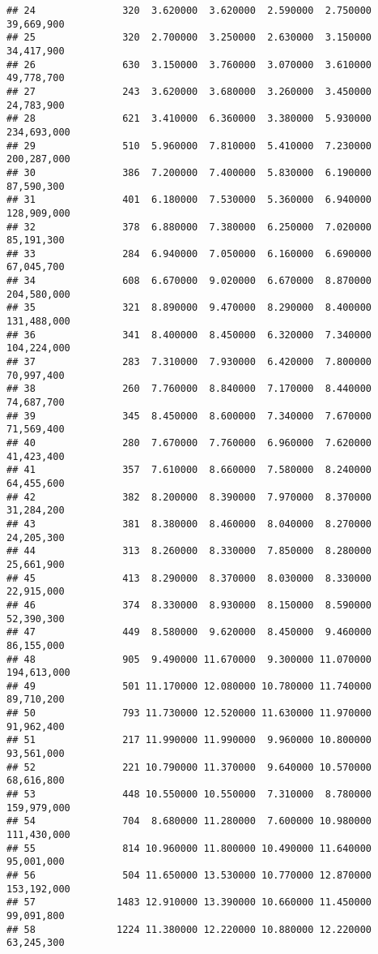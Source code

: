 \documentclass[]{article}
\begin{document}
\begin{verbatim}
## 24               320  3.620000  3.620000  2.590000  2.750000  39,669,900
## 25               320  2.700000  3.250000  2.630000  3.150000  34,417,900
## 26               630  3.150000  3.760000  3.070000  3.610000  49,778,700
## 27               243  3.620000  3.680000  3.260000  3.450000  24,783,900
## 28               621  3.410000  6.360000  3.380000  5.930000 234,693,000
## 29               510  5.960000  7.810000  5.410000  7.230000 200,287,000
## 30               386  7.200000  7.400000  5.830000  6.190000  87,590,300
## 31               401  6.180000  7.530000  5.360000  6.940000 128,909,000
## 32               378  6.880000  7.380000  6.250000  7.020000  85,191,300
## 33               284  6.940000  7.050000  6.160000  6.690000  67,045,700
## 34               608  6.670000  9.020000  6.670000  8.870000 204,580,000
## 35               321  8.890000  9.470000  8.290000  8.400000 131,488,000
## 36               341  8.400000  8.450000  6.320000  7.340000 104,224,000
## 37               283  7.310000  7.930000  6.420000  7.800000  70,997,400
## 38               260  7.760000  8.840000  7.170000  8.440000  74,687,700
## 39               345  8.450000  8.600000  7.340000  7.670000  71,569,400
## 40               280  7.670000  7.760000  6.960000  7.620000  41,423,400
## 41               357  7.610000  8.660000  7.580000  8.240000  64,455,600
## 42               382  8.200000  8.390000  7.970000  8.370000  31,284,200
## 43               381  8.380000  8.460000  8.040000  8.270000  24,205,300
## 44               313  8.260000  8.330000  7.850000  8.280000  25,661,900
## 45               413  8.290000  8.370000  8.030000  8.330000  22,915,000
## 46               374  8.330000  8.930000  8.150000  8.590000  52,390,300
## 47               449  8.580000  9.620000  8.450000  9.460000  86,155,000
## 48               905  9.490000 11.670000  9.300000 11.070000 194,613,000
## 49               501 11.170000 12.080000 10.780000 11.740000  89,710,200
## 50               793 11.730000 12.520000 11.630000 11.970000  91,962,400
## 51               217 11.990000 11.990000  9.960000 10.800000  93,561,000
## 52               221 10.790000 11.370000  9.640000 10.570000  68,616,800
## 53               448 10.550000 10.550000  7.310000  8.780000 159,979,000
## 54               704  8.680000 11.280000  7.600000 10.980000 111,430,000
## 55               814 10.960000 11.800000 10.490000 11.640000  95,001,000
## 56               504 11.650000 13.530000 10.770000 12.870000 153,192,000
## 57              1483 12.910000 13.390000 10.660000 11.450000  99,091,800
## 58              1224 11.380000 12.220000 10.880000 12.220000  63,245,300

\end{verbatim}
\end{document}
